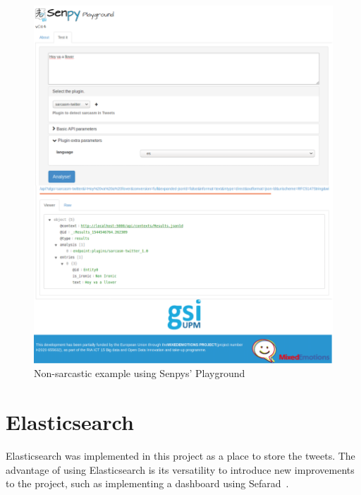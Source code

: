 \begin{figure}
	\includegraphics[width=\linewidth]{img/noironia.png}
	\caption{Non-sarcastic example using Senpys' Playground~\cite{senpy}}
	\label{fig:senpyex2}
\end{figure}
\section{Elasticsearch}
\label{sec:elastic}
Elasticsearch was implemented in this project as a place to store the tweets. The advantage of using Elasticsearch is its versatility to introduce new improvements to the project, such as implementing a dashboard using Sefarad~\cite{sefarad}.
